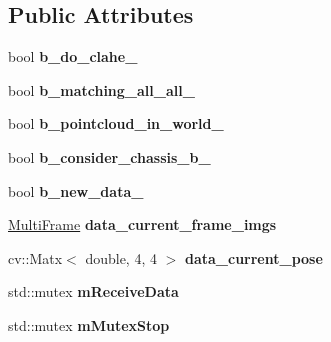 \subsection*{Public Attributes}
\begin{DoxyCompactItemize}
\item 
\mbox{\label{classcoldetector_1_1CollisionDetector_a6fa9191f807302da1bb1fae0d006be16}} 
bool {\bfseries b\+\_\+do\+\_\+clahe\+\_\+}
\item 
\mbox{\label{classcoldetector_1_1CollisionDetector_a8db158921586ac5eac43de655d2a49bf}} 
bool {\bfseries b\+\_\+matching\+\_\+all\+\_\+all\+\_\+}
\item 
\mbox{\label{classcoldetector_1_1CollisionDetector_a876a4626ad6f0b42eca1015736c08b12}} 
bool {\bfseries b\+\_\+pointcloud\+\_\+in\+\_\+world\+\_\+}
\item 
\mbox{\label{classcoldetector_1_1CollisionDetector_ab456210400a1ba6ef873609dcf8317ee}} 
bool {\bfseries b\+\_\+consider\+\_\+chassis\+\_\+b\+\_\+}
\item 
\mbox{\label{classcoldetector_1_1CollisionDetector_ab23340a36c5a6de7ad9f57acfc2f07de}} 
bool {\bfseries b\+\_\+new\+\_\+data\+\_\+}
\item 
\mbox{\label{classcoldetector_1_1CollisionDetector_ad71e38040d7e6f64ee79d095915321fe}} 
\hyperlink{classMultiFrame}{Multi\+Frame} {\bfseries data\+\_\+current\+\_\+frame\+\_\+imgs}
\item 
\mbox{\label{classcoldetector_1_1CollisionDetector_acda0507fbb212fe54a1165bd2b388c6d}} 
cv\+::\+Matx$<$ double, 4, 4 $>$ {\bfseries data\+\_\+current\+\_\+pose}
\item 
\mbox{\label{classcoldetector_1_1CollisionDetector_a3f9726dab2adda41e3c9a20dd496e0bd}} 
std\+::mutex {\bfseries m\+Receive\+Data}
\item 
\mbox{\label{classcoldetector_1_1CollisionDetector_a7d4d389640ecf22e2c8d3bed14d187fb}} 
std\+::mutex {\bfseries m\+Mutex\+Stop}
\end{DoxyCompactItemize}


